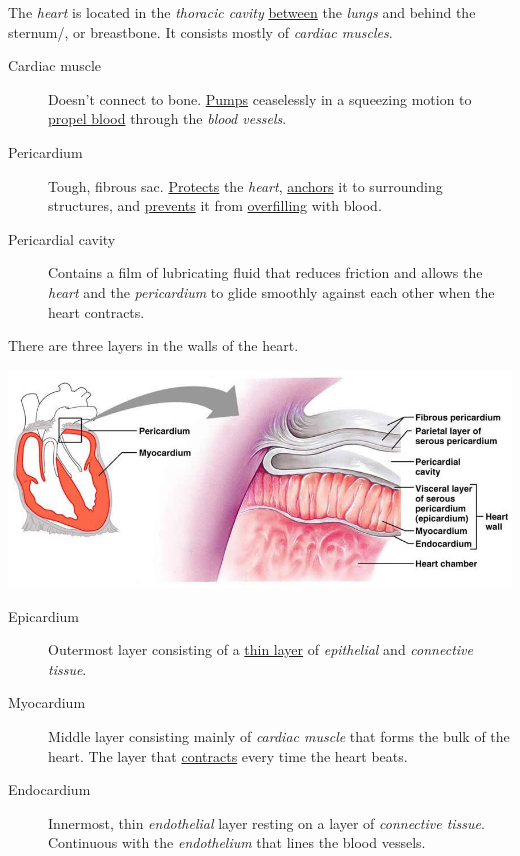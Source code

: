 \documentclass[11pt]{article}
\begin{document}
The \emph{heart} is located in the \emph{thoracic cavity} \uline{between} the \emph{lungs} and behind the
sternum/, or breastbone. It consists mostly of \emph{cardiac muscles}.

\begin{description}
\item[{Cardiac muscle}] Doesn't connect to bone. \uline{Pumps} ceaselessly in a
squeezing motion to \uline{propel blood} through the \emph{blood vessels}.
\item[{Pericardium}] Tough, fibrous sac. \uline{Protects} the \emph{heart}, \uline{anchors} it to
surrounding structures, and \uline{prevents} it from \uline{overfilling} with blood.
\item[{Pericardial cavity}] Contains a film of lubricating fluid that reduces
friction and allows the \emph{heart} and the \emph{pericardium} to glide smoothly
against each other when the heart contracts.
\end{description}

There are three layers in the walls of the heart.


\begin{center}
\includegraphics[width=.9\linewidth]{Ch. 8/The-pericardial-layers-and-layers-of-the-heart-wall_2016-10-25_22-42-22.jpg}
\end{center}

\begin{description}
\item[{Epicardium}] Outermost layer consisting of a \uline{thin layer} of \emph{epithelial} and
\emph{connective tissue}.
\item[{Myocardium}] Middle layer consisting mainly of \emph{cardiac muscle} that forms
the bulk of the heart. The layer that \uline{contracts} every time the heart
beats.
\item[{Endocardium}] Innermost, thin \emph{endothelial} layer resting on a layer of
\emph{connective tissue}. Continuous with the \emph{endothelium} that lines the blood
vessels.
\end{description}
\end{document}
